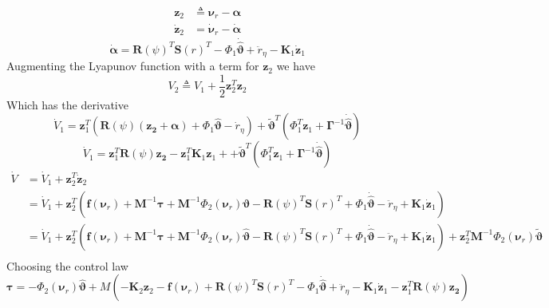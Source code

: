 \documentclass[12pt,a4]{article}
\begin{document}
\begin{align}
	\bm{z}_2       & \triangleq \bm{\nu}_r - \bm{\alpha}    \\
	\bm{\dot{z}}_2 & = \bm{\dot{\nu}}_r - \bm{\dot{\alpha}}
\end{align}
\begin{equation}
	\bm{\dot{\alpha}} =  \bm{R}(\psi)^T \bm{S}(r)^T - \Phi_1 \bm{\dot{\hat{\vartheta}}} + \ddot{r}_{\eta} - \bm{K}_1 \bm{\dot{z}}_1
\end{equation}
Augmenting the Lyapunov function with a term for $\bm{z}_2$ we have
\begin{equation}
	V_2 \triangleq V_1 + \frac{1}{2}\bm{z}_2^T\bm{z}_2
\end{equation}
Which has the derivative
\begin{equation}
	\dot{V}_1 = \bm{z}_1^T\left( \bm{R}(\psi)(\bm{z_2} + \bm{\alpha})+ \Phi_1\bm{\hat{\vartheta}} - \dot{r}_{\eta} \right)
	+ \bm{\tilde{\vartheta}}^T \left(  \Phi_1^T\bm{z}_1 + \bm{\Gamma}^{-1}\bm{\dot{\hat{\vartheta}}} \right)
\end{equation}
\begin{equation}
	\dot{V}_1 = \bm{z}_1^T \bm{R}(\psi) \bm{z_2} - \bm{z}_1^T \bm{K}_1 \bm{z}_1 +
	+ \bm{\tilde{\vartheta}}^T \left(  \Phi_1^T\bm{z}_1 + \bm{\Gamma}^{-1}\bm{\dot{\hat{\vartheta}}} \right)
\end{equation}
\begin{align}
	\dot{V} & = \dot{V}_1 + \bm{z}_2^T\dot{\bm{z}}_2                                                                                           \\
	        & = \dot{V}_1 + \bm{z}_2^T \left(  \bm{f}(\bm{\nu}_r) + \bm{M}^{-1}\bm{\tau} + \bm{M}^{-1}\Phi_2 (\bm{\nu}_r )\bm{\vartheta}
	-\bm{R}(\psi)^T \bm{S}(r)^T + \Phi_1 \bm{\dot{\hat{\vartheta}}} - \ddot{r}_{\eta} + \bm{K}_1 \bm{\dot{z}}_1  \right)                       \\
	        & = \dot{V}_1 + \bm{z}_2^T \left(  \bm{f}(\bm{\nu}_r) + \bm{M}^{-1}\bm{\tau} + \bm{M}^{-1}\Phi_2 (\bm{\nu}_r )\bm{\hat{\vartheta}}
	-\bm{R}(\psi)^T \bm{S}(r)^T + \Phi_1 \bm{\dot{\hat{\vartheta}}} - \ddot{r}_{\eta} + \bm{K}_1 \bm{\dot{z}}_1  \right)     +
	\bm{z}_2^T \bm{M}^{-1}\Phi_2 (\bm{\nu}_r )\bm{\tilde{\vartheta}}
	\\
\end{align}
Choosing the control law
\begin{equation}
	\bm{\tau} = -\Phi_2 (\bm{\nu}_r )\bm{\hat{\vartheta}} + M \left( - \bm{K}_2 \bm{z}_2 -\bm{f}(\bm{\nu}_r) +\bm{R}(\psi)^T \bm{S}(r)^T - \Phi_1 \bm{\dot{\hat{\vartheta}}}
	+ \ddot{r}_{\eta} - \bm{K}_1 \bm{\dot{z}}_1    -\bm{z}_1^T \bm{R}(\psi) \bm{z_2}   \right)
\end{equation}
\end{document}
